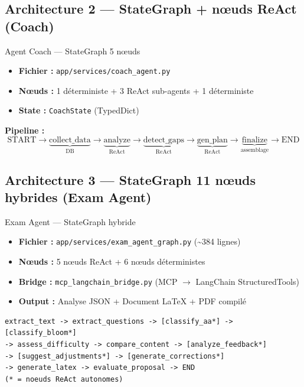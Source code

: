 \documentclass[12pt,a4paper]{article}
\begin{document}
\subsection{Architecture 2 --- StateGraph + nœuds ReAct (Coach)}

\begin{agentbox}[breakable]{Agent Coach --- StateGraph 5 nœuds}
\begin{itemize}[noitemsep]
  \item \textbf{Fichier :} \texttt{app/services/coach\_agent.py}
  \item \textbf{Nœuds :} 1 déterministe + 3 ReAct sub-agents + 1 déterministe
  \item \textbf{State :} \texttt{CoachState} (TypedDict)
\end{itemize}
\end{agentbox}

\textbf{Pipeline :}
\[
\text{START} \to \underbrace{\text{collect\_data}}_{\text{DB}} \to \underbrace{\text{analyze}}_{\text{ReAct}} \to \underbrace{\text{detect\_gaps}}_{\text{ReAct}} \to \underbrace{\text{gen\_plan}}_{\text{ReAct}} \to \underbrace{\text{finalize}}_{\text{assemblage}} \to \text{END}
\]

\subsection{Architecture 3 --- StateGraph 11 nœuds hybrides (Exam Agent)}

\begin{agentbox}[breakable]{Exam Agent --- StateGraph hybride}
\begin{itemize}[noitemsep]
  \item \textbf{Fichier :} \texttt{app/services/exam\_agent\_graph.py} (\textasciitilde384 lignes)
  \item \textbf{Nœuds :} 5 nœuds ReAct + 6 nœuds déterministes
  \item \textbf{Bridge :} \texttt{mcp\_langchain\_bridge.py} (MCP $\to$ LangChain StructuredTools)
  \item \textbf{Output :} Analyse JSON + Document \LaTeX{} + PDF compilé
\end{itemize}
\end{agentbox}

\begin{lstlisting}
extract_text -> extract_questions -> [classify_aa*] -> [classify_bloom*]
-> assess_difficulty -> compare_content -> [analyze_feedback*]
-> [suggest_adjustments*] -> [generate_corrections*]
-> generate_latex -> evaluate_proposal -> END
(* = noeuds ReAct autonomes)
\end{lstlisting}
\end{document}
